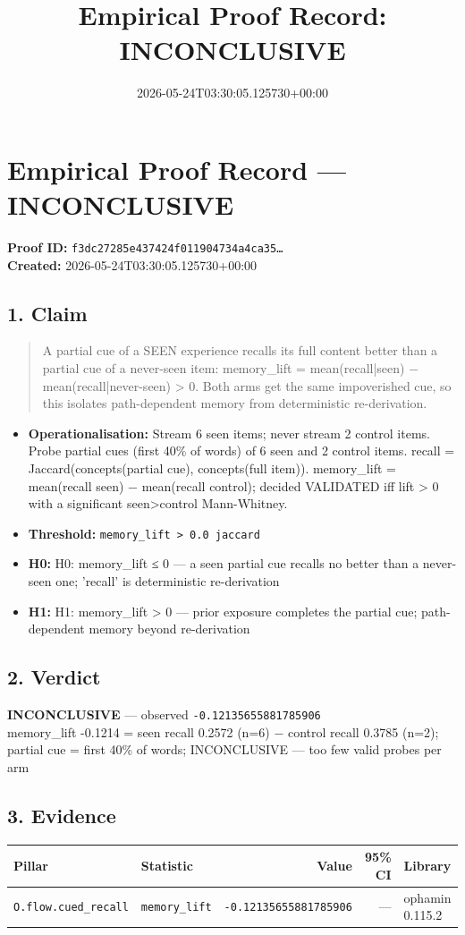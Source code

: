 \documentclass{article}
\title{Empirical Proof Record: INCONCLUSIVE}
\date{2026-05-24T03:30:05.125730+00:00}
\begin{document}
\maketitle
\section*{Empirical Proof Record --- \textcolor{inconclusive}{\textbf{INCONCLUSIVE}}}
\textbf{Proof ID:} \texttt{f3dc27285e437424f011904734a4ca35\dots}\\
\textbf{Created:} 2026-05-24T03:30:05.125730+00:00
\subsection*{1. Claim}
\begin{quote}A partial cue of a SEEN experience recalls its full content better than a partial cue of a never-seen item: memory\_lift = mean(recall|seen) − mean(recall|never-seen) > 0. Both arms get the same impoverished cue, so this isolates path-dependent memory from deterministic re-derivation.\end{quote}
\begin{itemize}
\item \textbf{Operationalisation:} Stream 6 seen items; never stream 2 control items. Probe partial cues (first 40\% of words) of 6 seen and 2 control items. recall = Jaccard(concepts(partial cue), concepts(full item)). memory\_lift = mean(recall seen) − mean(recall control); decided VALIDATED iff lift > 0 with a significant seen>control Mann-Whitney.
\item \textbf{Threshold:} \texttt{memory\_lift > 0.0 jaccard}
\item \textbf{H0:} H0: memory\_lift ≤ 0 — a seen partial cue recalls no better than a never-seen one; 'recall' is deterministic re-derivation
\item \textbf{H1:} H1: memory\_lift > 0 — prior exposure completes the partial cue; path-dependent memory beyond re-derivation
\end{itemize}
\subsection*{2. Verdict}
\textcolor{inconclusive}{\textbf{INCONCLUSIVE}} --- observed \texttt{-0.12135655881785906}\\
memory\_lift -0.1214 = seen recall 0.2572 (n=6) − control recall 0.3785 (n=2); partial cue = first 40\% of words; INCONCLUSIVE — too few valid probes per arm
\subsection*{3. Evidence}
\begin{tabular}{llrrl}\toprule
\textbf{Pillar} & \textbf{Statistic} & \textbf{Value} & \textbf{95\% CI} & \textbf{Library} \\\midrule
\texttt{O.flow.cued\_recall} & \texttt{memory\_lift} & \texttt{-0.12135655881785906} & --- & ophamin 0.115.2 \\
\bottomrule\end{tabular}
\end{document}
